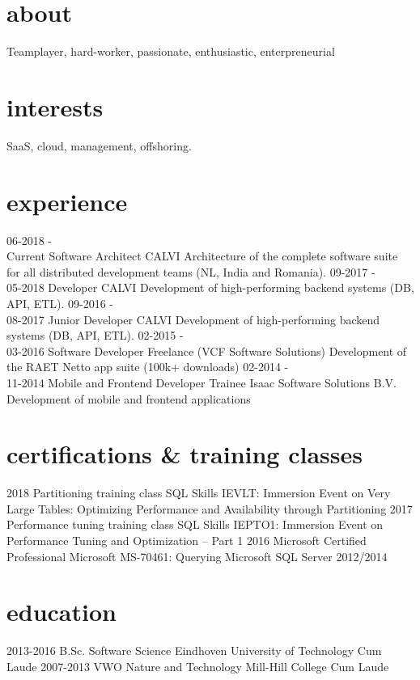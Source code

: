 \documentclass[]{friggeri-cv}
\begin{document}
\section{about}
Teamplayer, hard-worker, passionate, enthusiastic, enterpreneurial

\section{interests}
SaaS, cloud, management, offshoring.

\section{experience}

\begin{entrylist}
  \entry
    {06-2018 -\\Current}
    {Software Architect}
    {CALVI}
    {Architecture of the complete software suite for all distributed development teams (NL, India and Romania).}
  \entry
    {09-2017 -\\05-2018}
    {Developer}
    {CALVI}
    {Development of high-performing backend systems (DB, API, ETL).}
  \entry
    {09-2016 -\\08-2017}
    {Junior Developer}
    {CALVI}
    {Development of high-performing backend systems (DB, API, ETL).}
  \entry
    {02-2015 -\\03-2016}
    {Software Developer}
    {Freelance (VCF Software Solutions)}
    {Development of the RAET Netto app suite (100k+ downloads)}
  \entry
    {02-2014 -\\11-2014}
    {Mobile and Frontend Developer Trainee}
    {Isaac Software Solutions B.V.}
    {Development of mobile and frontend applications}
\end{entrylist}

\section{certifications \& training classes}
\begin{entrylist}
  \entry
    {2018}
    {Partitioning training class}
    {SQL Skills}
    {IEVLT: Immersion Event on Very Large Tables: Optimizing Performance and Availability through Partitioning}
  \entry
    {2017}
    {Performance tuning training class}
    {SQL Skills}
    {IEPTO1: Immersion Event on Performance Tuning and Optimization – Part 1}
  \entry
    {2016}
    {Microsoft Certified Professional}
    {Microsoft}
    {MS-70461:  Querying Microsoft SQL Server 2012/2014}
\end{entrylist}

\section{education}
\begin{entrylist}
  \entry
    {2013-2016}
    {B.Sc. Software Science}
    {Eindhoven University of Technology}
    {Cum Laude}
  \entry
    {2007-2013}
    {VWO Nature and Technology}
    {Mill-Hill College}
    {Cum Laude}
\end{entrylist}
\end{document}
